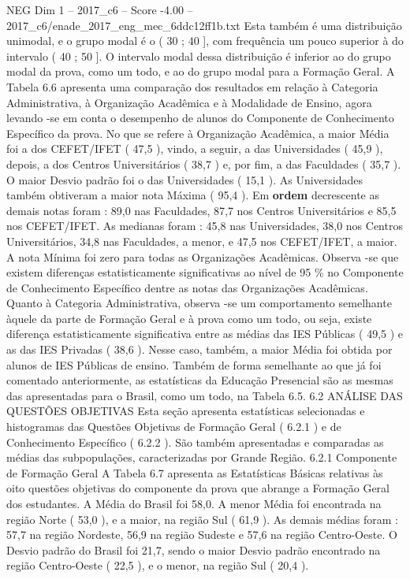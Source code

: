 \begin{textsample}{NEG Dim 1 – 2017\_c6 – Score -4.00 – 2017\_c6/enade\_2017\_eng\_mec\_6ddc12ff1b.txt}
Esta também é uma distribuição unimodal, e o grupo modal é o ( 30 ; 40 ], com frequência um pouco superior à do intervalo ( 40 ; 50 ].
O intervalo modal dessa distribuição é inferior ao do grupo modal da prova, como um todo, e ao do grupo modal para a Formação Geral.
A Tabela 6.6 apresenta uma comparação dos resultados em relação à Categoria Administrativa, à Organização Acadêmica e à Modalidade de Ensino, agora levando -se em conta o desempenho de alunos do Componente de Conhecimento Específico da prova.
No que se refere à Organização Acadêmica, a maior Média foi a dos CEFET/IFET ( 47,5 ), vindo, a seguir, a das Universidades ( 45,9 ), depois, a dos Centros Universitários ( 38,7 ) e, por fim, a das Faculdades ( 35,7 ).
O maior Desvio padrão foi o das Universidades ( 15,1 ).
As Universidades também obtiveram a maior nota Máxima ( 95,4 ).
Em \textbf{ordem} decrescente as demais notas foram : 89,0 nas Faculdades, 87,7 nos Centros Universitários e 85,5 nos CEFET/IFET.
As medianas foram : 45,8 nas Universidades, 38,0 nos Centros Universitários, 34,8 nas Faculdades, a menor, e 47,5 nos CEFET/IFET, a maior.
A nota Mínima foi zero para todas as Organizações Acadêmicas.
Observa -se que existem diferenças estatisticamente significativas ao nível de 95 \% no Componente de Conhecimento Específico dentre as notas das Organizações Acadêmicas.
Quanto à Categoria Administrativa, observa -se um comportamento semelhante àquele da parte de Formação Geral e à prova como um todo, ou seja, existe diferença estatisticamente significativa entre as médias das IES Públicas ( 49,5 ) e as das IES Privadas ( 38,6 ).
Nesse caso, também, a maior Média foi obtida por alunos de IES Públicas de ensino.
Também de forma semelhante ao que já foi comentado anteriormente, as estatísticas da Educação Presencial são as mesmas das apresentadas para o Brasil, como um todo, na Tabela 6.5. 6.2 ANÁLISE DAS QUESTÕES OBJETIVAS Esta seção apresenta estatísticas selecionadas e histogramas das Questões Objetivas de Formação Geral ( 6.2.1 ) e de Conhecimento Específico ( 6.2.2 ).
São também apresentadas e comparadas as médias das subpopulações, caracterizadas por Grande Região. 6.2.1 Componente de Formação Geral A Tabela 6.7 apresenta as Estatísticas Básicas relativas às oito questões objetivas do componente da prova que abrange a Formação Geral dos estudantes.
A Média do Brasil foi 58,0.
A menor Média foi encontrada na região Norte ( 53,0 ), e a maior, na região Sul ( 61,9 ).
As demais médias foram : 57,7 na região Nordeste, 56,9 na região Sudeste e 57,6 na região Centro-Oeste.
O Desvio padrão do Brasil foi 21,7, sendo o maior Desvio padrão encontrado na região Centro-Oeste ( 22,5 ), e o menor, na região Sul ( 20,4 ).

\end{textsample}
